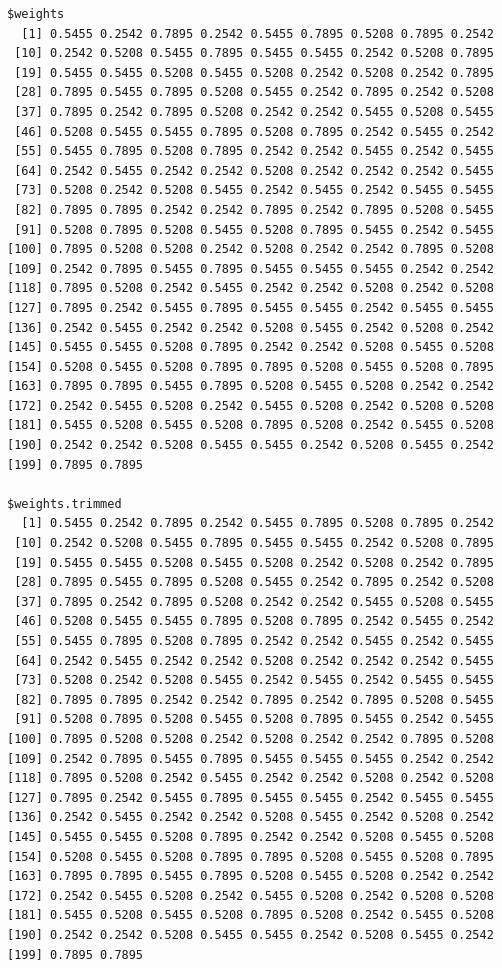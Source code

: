 \documentclass[a4paper]{article}
\begin{document}
\begin{verbatim}
$weights
  [1] 0.5455 0.2542 0.7895 0.2542 0.5455 0.7895 0.5208 0.7895 0.2542
 [10] 0.2542 0.5208 0.5455 0.7895 0.5455 0.5455 0.2542 0.5208 0.7895
 [19] 0.5455 0.5455 0.5208 0.5455 0.5208 0.2542 0.5208 0.2542 0.7895
 [28] 0.7895 0.5455 0.7895 0.5208 0.5455 0.2542 0.7895 0.2542 0.5208
 [37] 0.7895 0.2542 0.7895 0.5208 0.2542 0.2542 0.5455 0.5208 0.5455
 [46] 0.5208 0.5455 0.5455 0.7895 0.5208 0.7895 0.2542 0.5455 0.2542
 [55] 0.5455 0.7895 0.5208 0.7895 0.2542 0.2542 0.5455 0.2542 0.5455
 [64] 0.2542 0.5455 0.2542 0.2542 0.5208 0.2542 0.2542 0.2542 0.5455
 [73] 0.5208 0.2542 0.5208 0.5455 0.2542 0.5455 0.2542 0.5455 0.5455
 [82] 0.7895 0.7895 0.2542 0.2542 0.7895 0.2542 0.7895 0.5208 0.5455
 [91] 0.5208 0.7895 0.5208 0.5455 0.5208 0.7895 0.5455 0.2542 0.5455
[100] 0.7895 0.5208 0.5208 0.2542 0.5208 0.2542 0.2542 0.7895 0.5208
[109] 0.2542 0.7895 0.5455 0.7895 0.5455 0.5455 0.5455 0.2542 0.2542
[118] 0.7895 0.5208 0.2542 0.5455 0.2542 0.2542 0.5208 0.2542 0.5208
[127] 0.7895 0.2542 0.5455 0.7895 0.5455 0.5455 0.2542 0.5455 0.5455
[136] 0.2542 0.5455 0.2542 0.2542 0.5208 0.5455 0.2542 0.5208 0.2542
[145] 0.5455 0.5455 0.5208 0.7895 0.2542 0.2542 0.5208 0.5455 0.5208
[154] 0.5208 0.5455 0.5208 0.7895 0.7895 0.5208 0.5455 0.5208 0.7895
[163] 0.7895 0.7895 0.5455 0.7895 0.5208 0.5455 0.5208 0.2542 0.2542
[172] 0.2542 0.5455 0.5208 0.2542 0.5455 0.5208 0.2542 0.5208 0.5208
[181] 0.5455 0.5208 0.5455 0.5208 0.7895 0.5208 0.2542 0.5455 0.5208
[190] 0.2542 0.2542 0.5208 0.5455 0.5455 0.2542 0.5208 0.5455 0.2542
[199] 0.7895 0.7895

$weights.trimmed
  [1] 0.5455 0.2542 0.7895 0.2542 0.5455 0.7895 0.5208 0.7895 0.2542
 [10] 0.2542 0.5208 0.5455 0.7895 0.5455 0.5455 0.2542 0.5208 0.7895
 [19] 0.5455 0.5455 0.5208 0.5455 0.5208 0.2542 0.5208 0.2542 0.7895
 [28] 0.7895 0.5455 0.7895 0.5208 0.5455 0.2542 0.7895 0.2542 0.5208
 [37] 0.7895 0.2542 0.7895 0.5208 0.2542 0.2542 0.5455 0.5208 0.5455
 [46] 0.5208 0.5455 0.5455 0.7895 0.5208 0.7895 0.2542 0.5455 0.2542
 [55] 0.5455 0.7895 0.5208 0.7895 0.2542 0.2542 0.5455 0.2542 0.5455
 [64] 0.2542 0.5455 0.2542 0.2542 0.5208 0.2542 0.2542 0.2542 0.5455
 [73] 0.5208 0.2542 0.5208 0.5455 0.2542 0.5455 0.2542 0.5455 0.5455
 [82] 0.7895 0.7895 0.2542 0.2542 0.7895 0.2542 0.7895 0.5208 0.5455
 [91] 0.5208 0.7895 0.5208 0.5455 0.5208 0.7895 0.5455 0.2542 0.5455
[100] 0.7895 0.5208 0.5208 0.2542 0.5208 0.2542 0.2542 0.7895 0.5208
[109] 0.2542 0.7895 0.5455 0.7895 0.5455 0.5455 0.5455 0.2542 0.2542
[118] 0.7895 0.5208 0.2542 0.5455 0.2542 0.2542 0.5208 0.2542 0.5208
[127] 0.7895 0.2542 0.5455 0.7895 0.5455 0.5455 0.2542 0.5455 0.5455
[136] 0.2542 0.5455 0.2542 0.2542 0.5208 0.5455 0.2542 0.5208 0.2542
[145] 0.5455 0.5455 0.5208 0.7895 0.2542 0.2542 0.5208 0.5455 0.5208
[154] 0.5208 0.5455 0.5208 0.7895 0.7895 0.5208 0.5455 0.5208 0.7895
[163] 0.7895 0.7895 0.5455 0.7895 0.5208 0.5455 0.5208 0.2542 0.2542
[172] 0.2542 0.5455 0.5208 0.2542 0.5455 0.5208 0.2542 0.5208 0.5208
[181] 0.5455 0.5208 0.5455 0.5208 0.7895 0.5208 0.2542 0.5455 0.5208
[190] 0.2542 0.2542 0.5208 0.5455 0.5455 0.2542 0.5208 0.5455 0.2542
[199] 0.7895 0.7895
\end{verbatim}






\end{document}
